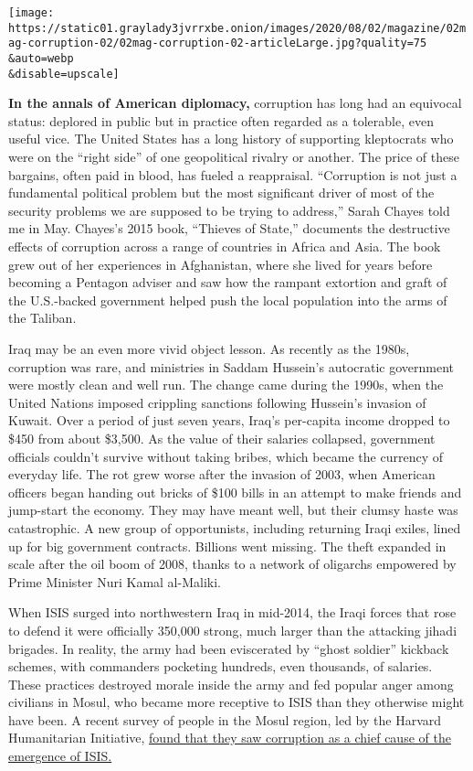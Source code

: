 \texttt{[image: https://static01.graylady3jvrrxbe.onion/images/2020/08/02/magazine/02mag-corruption-02/02mag-corruption-02-articleLarge.jpg?quality=75\\\&auto=webp\\\&disable=upscale]}

\textbf{In the annals of American diplomacy,} corruption has long had an
equivocal status: deplored in public but in practice often regarded as a
tolerable, even useful vice. The United States has a long history of
supporting kleptocrats who were on the ``right side'' of one
geopolitical rivalry or another. The price of these bargains, often paid
in blood, has fueled a reappraisal. ``Corruption is not just a
fundamental political problem but the most significant driver of most of
the security problems we are supposed to be trying to address,'' Sarah
Chayes told me in May. Chayes's 2015 book, ``Thieves of State,''
documents the destructive effects of corruption across a range of
countries in Africa and Asia. The book grew out of her experiences in
Afghanistan, where she lived for years before becoming a Pentagon
adviser and saw how the rampant extortion and graft of the U.S.-backed
government helped push the local population into the arms of the
Taliban.

Iraq may be an even more vivid object lesson. As recently as the 1980s,
corruption was rare, and ministries in Saddam Hussein's autocratic
government were mostly clean and well run. The change came during the
1990s, when the United Nations imposed crippling sanctions following
Hussein's invasion of Kuwait. Over a period of just seven years, Iraq's
per-capita income dropped to \$450 from about \$3,500. As the value of
their salaries collapsed, government officials couldn't survive without
taking bribes, which became the currency of everyday life. The rot grew
worse after the invasion of 2003, when American officers began handing
out bricks of \$100 bills in an attempt to make friends and jump-start
the economy. They may have meant well, but their clumsy haste was
catastrophic. A new group of opportunists, including returning Iraqi
exiles, lined up for big government contracts. Billions went missing.
The theft expanded in scale after the oil boom of 2008, thanks to a
network of oligarchs empowered by Prime Minister Nuri Kamal al-Maliki.

When ISIS surged into northwestern Iraq in mid-2014, the Iraqi forces
that rose to defend it were officially 350,000 strong, much larger than
the attacking jihadi brigades. In reality, the army had been eviscerated
by ``ghost soldier'' kickback schemes, with commanders pocketing
hundreds, even thousands, of salaries. These practices destroyed morale
inside the army and fed popular anger among civilians in Mosul, who
became more receptive to ISIS than they otherwise might have been. A
recent survey of people in the Mosul region, led by the Harvard
Humanitarian Initiative,
\href{https://hhi.harvard.edu/publications/english-version-never-forget-views-peace-and-justice-within-conflict-affected}{found
that they saw corruption as a chief cause of the emergence of ISIS.}

